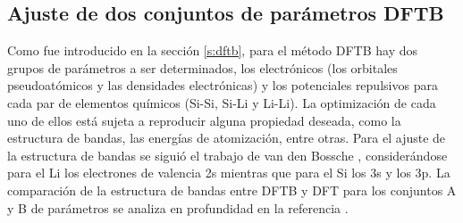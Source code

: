 \subsection{Ajuste de dos conjuntos de parámetros DFTB}

Como fue introducido en la sección \ref{s:dftb}, para el método DFTB hay dos 
grupos de parámetros a ser determinados, los electrónicos (los orbitales 
pseudoatómicos y las densidades electrónicas) y los potenciales repulsivos para 
cada par de elementos químicos (Si-Si, Si-Li y Li-Li). La optimización de cada 
uno de ellos está sujeta a reproducir alguna propiedad deseada, como la 
estructura de bandas, las energías de atomización, entre otras. Para el ajuste
de la estructura de bandas se siguió el trabajo de van den Bossche \cite{van2019},
considerándose para el Li los electrones de valencia 2s mientras que para el Si 
los 3s y los 3p. La comparación de la estructura de bandas entre DFTB y DFT para 
los conjuntos A y B de parámetros se analiza en profundidad en la referencia 
\cite{oviedo2023}.

